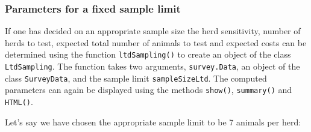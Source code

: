 \documentclass[nojss]{jss}
\begin{document}
\subsubsection{Parameters for a fixed sample limit}

If one has decided on an appropriate sample size the herd sensitivity, number of herds to test, expected total number of animals to test and expected costs can be determined using the function \texttt{ltdSampling()}  to create an object of the class \texttt{LtdSampling}.   The function takes two arguments, \texttt{survey.Data}, an object of the class \texttt{SurveyData}, and the sample limit \texttt{sampleSizeLtd}. The computed parameters can again be displayed using the methods \texttt{show()}, \texttt{summary()} and \texttt{HTML()}.   

Let's say we have chosen the appropriate sample limit to be 7 animals per herd:
\end{document}
